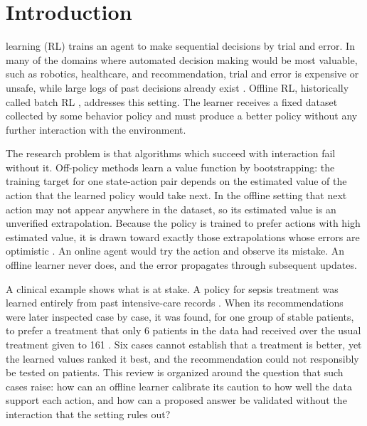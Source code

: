 \documentclass[journal]{IEEEtran}
\begin{document}
\section{Introduction}
 learning (RL) trains an agent to make sequential decisions by trial and error. In many of the domains where automated decision making would be most valuable, such as robotics, healthcare, and recommendation, trial and error is expensive or unsafe, while large logs of past decisions already exist \cite{levine2020tutorial,dulacarnold2021challenges}. Offline RL, historically called batch RL \cite{lange2012batch}, addresses this setting. The learner receives a fixed dataset collected by some behavior policy and must produce a better policy without any further interaction with the environment.

The research problem is that algorithms which succeed with interaction fail without it. Off-policy methods learn a value function by bootstrapping: the training target for one state-action pair depends on the estimated value of the action that the learned policy would take next. In the offline setting that next action may not appear anywhere in the dataset, so its estimated value is an unverified extrapolation. Because the policy is trained to prefer actions with high estimated value, it is drawn toward exactly those extrapolations whose errors are optimistic \cite{fujimoto2019bcq,kumar2019bear}. An online agent would try the action and observe its mistake. An offline learner never does, and the error propagates through subsequent updates.

A clinical example shows what is at stake. A policy for sepsis treatment was learned entirely from past intensive-care records \cite{komorowski2018clinician}. When its recommendations were later inspected case by case, it was found, for one group of stable patients, to prefer a treatment that only 6 patients in the data had received over the usual treatment given to 161 \cite{ji2021trajectory}. Six cases cannot establish that a treatment is better, yet the learned values ranked it best, and the recommendation could not responsibly be tested on patients. This review is organized around the question that such cases raise: how can an offline learner calibrate its caution to how well the data support each action, and how can a proposed answer be validated without the interaction that the setting rules out?
\end{document}
